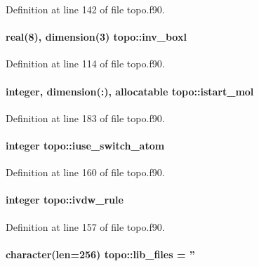 Definition at line 142 of file topo.\-f90.

\hypertarget{classtopo_ad55ddb5451fe2a4663e4e0b8bd9d3962}{
\paragraph[{inv\-\_\-boxl}]{\setlength{\rightskip}{0pt plus 5cm}real(8), dimension(3) topo\-::inv\-\_\-boxl}}\label{classtopo_ad55ddb5451fe2a4663e4e0b8bd9d3962}


Definition at line 114 of file topo.\-f90.

\hypertarget{classtopo_a96b6bc2cb9d036ac0e8d9592233b6111}{
\paragraph[{istart\-\_\-mol}]{\setlength{\rightskip}{0pt plus 5cm}integer, dimension(\-:), allocatable topo\-::istart\-\_\-mol}}\label{classtopo_a96b6bc2cb9d036ac0e8d9592233b6111}


Definition at line 183 of file topo.\-f90.

\hypertarget{classtopo_a2d534e5252ccf0786f939d8cacdb8d1f}{
\paragraph[{iuse\-\_\-switch\-\_\-atom}]{\setlength{\rightskip}{0pt plus 5cm}integer topo\-::iuse\-\_\-switch\-\_\-atom}}\label{classtopo_a2d534e5252ccf0786f939d8cacdb8d1f}


Definition at line 160 of file topo.\-f90.

\hypertarget{classtopo_aecebb95712ccb5cb3945600dccbd9721}{
\paragraph[{ivdw\-\_\-rule}]{\setlength{\rightskip}{0pt plus 5cm}integer topo\-::ivdw\-\_\-rule}}\label{classtopo_aecebb95712ccb5cb3945600dccbd9721}


Definition at line 157 of file topo.\-f90.

\hypertarget{classtopo_a36d8911e30fa5afaf992961a17174479}{
\paragraph[{lib\-\_\-files}]{\setlength{\rightskip}{0pt plus 5cm}character(len=256) topo\-::lib\-\_\-files = ''}}\label{classtopo_a36d8911e30fa5afaf992961a17174479}


